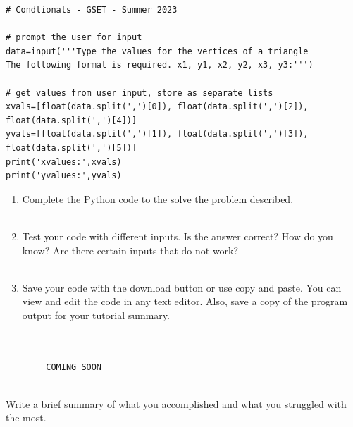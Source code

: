 \documentclass[12pt]{article}
\begin{document}
\begin{description}[labelindent=1cm]
        \begin{lstlisting}
# Condtionals - GSET - Summer 2023 

# prompt the user for input
data=input('''Type the values for the vertices of a triangle
The following format is required. x1, y1, x2, y2, x3, y3:''')

# get values from user input, store as separate lists 
xvals=[float(data.split(',')[0]), float(data.split(',')[2]), float(data.split(',')[4])]
yvals=[float(data.split(',')[1]), float(data.split(',')[3]), float(data.split(',')[5])]
print('xvalues:',xvals)
print('yvalues:',yvals)

        \end{lstlisting}

\newpage
        \item[\textbf{\underline{Testing:}}] \hfill \vspace{0mm}
        \begin{enumerate}

            \item Complete the Python code to the solve the problem described. \\\\
            \item Test your code with different inputs. Is the answer correct? How do you know? Are there certain inputs that do not work? \\\\
            \item Save your code with the download button or use copy and paste. You can view and edit the code in any text editor. Also, save a copy of the program output for your tutorial summary. \\\\

        \end{enumerate}

        \item[\textbf{\underline{Solution Code:}}] \hfill \vspace{0mm}

        \begin{lstlisting}

        COMING SOON

        \end{lstlisting}

        \item[\textbf{\underline{Tutorial Summary:}}] \hfill \vspace{3mm}\\ 
        Write a brief summary of what you accomplished and what you struggled with the most. 


\end{description}
\end{document}
